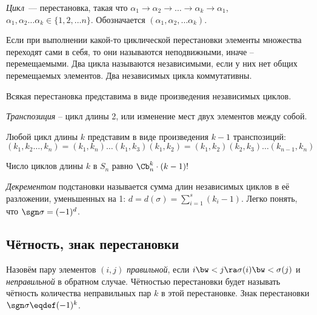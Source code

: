 \begin{df}%
\emph{Цикл}~--- перестановка, такая что $\alpha_1 \rightarrow \alpha_2 \rightarrow \dots \rightarrow \alpha_k \rightarrow \alpha_1$, $\alpha_1,\alpha_2\dots\alpha_k \in \{1,2,\dots n\}$. Обозначается $(\alpha_1,\alpha_2,\dots \alpha_k)$. 

Если при выполнении какой-то циклической перестановки элементы множества переходят сами в себя, то они называются неподвижными, иначе -- перемещаемыми. Два цикла называются независимыми, если у них нет общих перемещаемых элементов. Два независимых цикла коммутативны.
\end{df}

\begin{theorem}
Всякая перестановка представима в виде произведения независимых циклов.
\end{theorem}

\begin{df}%
\emph{Транспозиция} -- цикл длины 2, или изменение мест двух элементов между собой.
\end{df}

\begin{note}
  Любой цикл длины $k$ представим в виде произведения $k-1$ транспозиций:
  $$ (k_1,k_2\dots,k_n) = (k_1,k_n)\dots(k_1,k_3)(k_1,k_2)=(k_1,k_2)(k_2,k_3)\dots(k_{n-1},k_n) $$
\end{note}
\begin{note}
  Число циклов длины $k$ в $S_n$ равно $\Cb_n^k \cdot(k-1)!$
\end{note}

\begin{df}
  \emph{Декрементом} подстановки называется сумма длин независимых
  циклов в её разложении, уменьшенных на 1:
  $d=d(\sigma)=\sum\limits_{i=1}^s(k_i-1)$. Легко понять, что
  $\sgn\sigma=(-1)^d$.
\end{df}

\newpage
\subsection{Чётность, знак перестановки}

\begin{df}
  Назовём пару элементов $(i,j)$ \emph{правильной}, если $i\bw<j\ra\sigma(i)\bw<\sigma(j)$ и \emph{неправильной} в обратном случае. Чётностью перестановки будет называть чётность количества неправильных пар $k$ в этой перестановке. Знак перестановки $\sgn\sigma\eqdef(-1)^k$.
\end{df}


